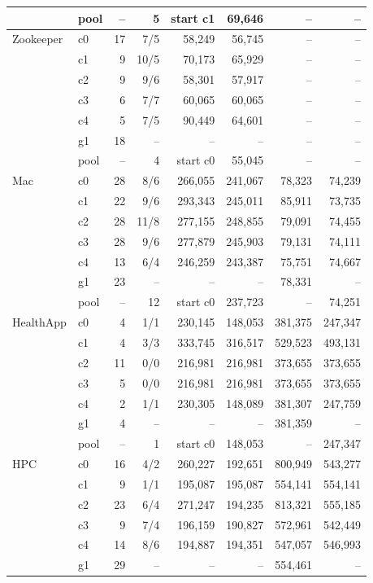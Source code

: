 \begin{longtable}{llrrrrrr}
 & pool & -- & 5 & start c1 & 69,646 & -- & -- \\
\midrule
Zookeeper & c0 & 17 & 7/5 & 58,249 & 56,745 & -- & -- \\
 & c1 & 9 & 10/5 & 70,173 & 65,929 & -- & -- \\
 & c2 & 9 & 9/6 & 58,301 & 57,917 & -- & -- \\
 & c3 & 6 & 7/7 & 60,065 & 60,065 & -- & -- \\
 & c4 & 5 & 7/5 & 90,449 & 64,601 & -- & -- \\
 & g1 & 18 & -- & -- & -- & -- & -- \\
 & pool & -- & 4 & start c0 & 55,045 & -- & -- \\
\midrule
Mac & c0 & 28 & 8/6 & 266,055 & 241,067 & 78,323 & 74,239 \\
 & c1 & 22 & 9/6 & 293,343 & 245,011 & 85,911 & 73,735 \\
 & c2 & 28 & 11/8 & 277,155 & 248,855 & 79,091 & 74,455 \\
 & c3 & 28 & 9/6 & 277,879 & 245,903 & 79,131 & 74,111 \\
 & c4 & 13 & 6/4 & 246,259 & 243,387 & 75,751 & 74,667 \\
 & g1 & 23 & -- & -- & -- & 78,331 & -- \\
 & pool & -- & 12 & start c0 & 237,723 & -- & 74,251 \\
\midrule
HealthApp & c0 & 4 & 1/1 & 230,145 & 148,053 & 381,375 & 247,347 \\
 & c1 & 4 & 3/3 & 333,745 & 316,517 & 529,523 & 493,131 \\
 & c2 & 11 & 0/0 & 216,981 & 216,981 & 373,655 & 373,655 \\
 & c3 & 5 & 0/0 & 216,981 & 216,981 & 373,655 & 373,655 \\
 & c4 & 2 & 1/1 & 230,305 & 148,089 & 381,307 & 247,759 \\
 & g1 & 4 & -- & -- & -- & 381,359 & -- \\
 & pool & -- & 1 & start c0 & 148,053 & -- & 247,347 \\
\midrule
HPC & c0 & 16 & 4/2 & 260,227 & 192,651 & 800,949 & 543,277 \\
 & c1 & 9 & 1/1 & 195,087 & 195,087 & 554,141 & 554,141 \\
 & c2 & 23 & 6/4 & 271,247 & 194,235 & 813,321 & 555,185 \\
 & c3 & 9 & 7/4 & 196,159 & 190,827 & 572,961 & 542,449 \\
 & c4 & 14 & 8/6 & 194,887 & 194,351 & 547,057 & 546,993 \\
 & g1 & 29 & -- & -- & -- & 554,461 & -- \\

\end{longtable}
